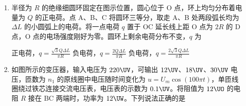 \documentclass[\gkver]{gaokaozhenti}
\begin{document}
\begin{enumerate}
{B．根据能量守恒定律，可知高压气体释放的能量转化为火箭的动能、火箭的重力势能和内能，故 B 错误；

C．根据动量定理，可知合力冲量等于火箭动量的增加量，故 C 错误；

D．根据功能关系，可知高压气体的推力和空气阻力对火箭做功之和等于火箭机械能的增加量，故 D 错误。

故选 A。
}

\item
半径为 $R$ 的绝缘细圆环固定在图示位置，圆心位于 O 点，环上均匀分布着电量为 $Q$ 的正电荷。点 A、B、C 将圆环三等分，取走 A、B 处两段弧长均为 $\Delta L$ 的小圆弧上的电荷。将一点电荷 $q$ 置于 OC 延长线上距 O 点为 $2R$ 的 D 点，O 点的电场强度刚好为零。圆环上剩余电荷分布不变，$q$ 为


{正电荷，$q = \frac{\sqrt{3}Q\Delta L}{\pi R}$}
{负电荷，$q = \frac{2Q\Delta L}{\pi R}$}
{负电荷，$q = \frac{2\sqrt{3}Q\Delta L}{\pi R}$}


\item
如图所示的变压器，输入电压为 $220 \UV$，可输出 $12 \UV$、$18 \UV$、$30 \UV$ 电压，匝数为 $n_{1}$ 的原线圈中电压随时间变化为 $u = U_{m}\cos(100\pi t)$，单匝线圈绕过铁芯连接交流电压表，电压表的示数为 $0.1 \UV$。将阻值为 $12 \UO$ 的电阻 $R$ 接在 BC 两端时，功率为 $12 \UW$。下列说法正确的是


\end{enumerate}
\end{document}
